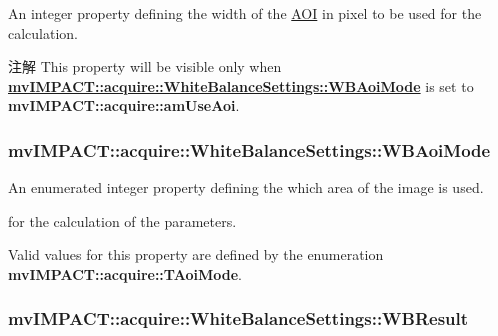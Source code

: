 An integer property defining the width of the \hyperlink{struct_a_o_i}{A\+O\+I} in pixel to be used for the calculation. 

\begin{DoxyNote}{注解}
This property will be visible only when {\bfseries \hyperlink{classmv_i_m_p_a_c_t_1_1acquire_1_1_white_balance_settings_a60af41e60e38c698d39b36ee745b2648}{mv\+I\+M\+P\+A\+C\+T\+::acquire\+::\+White\+Balance\+Settings\+::\+W\+B\+Aoi\+Mode}} is set to {\bfseries mv\+I\+M\+P\+A\+C\+T\+::acquire\+::am\+Use\+Aoi}. 
\end{DoxyNote}
\hypertarget{classmv_i_m_p_a_c_t_1_1acquire_1_1_white_balance_settings_a60af41e60e38c698d39b36ee745b2648}{
\subsubsection[{W\+B\+Aoi\+Mode}]{ mv\+I\+M\+P\+A\+C\+T\+::acquire\+::\+White\+Balance\+Settings\+::\+W\+B\+Aoi\+Mode}}\label{classmv_i_m_p_a_c_t_1_1acquire_1_1_white_balance_settings_a60af41e60e38c698d39b36ee745b2648}


An enumerated integer property defining the which area of the image is used. 

for the calculation of the parameters.

Valid values for this property are defined by the enumeration {\bfseries mv\+I\+M\+P\+A\+C\+T\+::acquire\+::\+T\+Aoi\+Mode}. \hypertarget{classmv_i_m_p_a_c_t_1_1acquire_1_1_white_balance_settings_adcbeebe2ff82d093cebfb3477f378e52}{
\subsubsection[{W\+B\+Result}]{ mv\+I\+M\+P\+A\+C\+T\+::acquire\+::\+White\+Balance\+Settings\+::\+W\+B\+Result}}\label{classmv_i_m_p_a_c_t_1_1acquire_1_1_white_balance_settings_adcbeebe2ff82d093cebfb3477f378e52}


